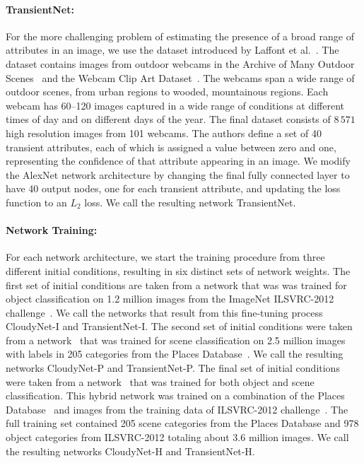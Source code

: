 \documentclass[10pt,twocolumn,letterpaper]{article}
\begin{document}
\paragraph{TransientNet:} For the more challenging problem of estimating the
presence of a broad range of attributes in an image, we use the dataset
introduced by Laffont et al.~\cite{Laffont14}.  The dataset contains images
from outdoor webcams in the Archive of Many Outdoor Scenes~\cite{jacobs07amos}
and the Webcam Clip Art Dataset~\cite{lalondesig09}.  The webcams span a wide
range of outdoor scenes, from urban regions to wooded, mountainous regions.
Each webcam has 60--120 images captured in a wide range of conditions at
different times of day and on different days of the year.  The final dataset
consists of $8\,571$ high resolution images from 101 webcams.  The authors
define a set of 40 transient attributes, each of which is assigned a value
between zero and one, representing the confidence of that attribute appearing
in an image. We modify the AlexNet network architecture by changing the final
fully connected layer to have 40 output nodes, one for each transient
attribute, and updating the loss function to an $L_2$ loss. We call the
resulting network TransientNet. 

\vspace{-1em}
\paragraph{Network Training:} For each network architecture, we start the training procedure from three different initial conditions,
resulting in six distinct sets of network weights. The first set of initial
conditions are taken from a network that was was trained for object
classification on 1.2 million images from the ImageNet ILSVRC-2012
challenge~\cite{ILSVRCarxiv14}.  We call the networks that result from this
fine-tuning process CloudyNet-I and TransientNet-I.  The second set of initial
conditions were taken from a network~\cite{zhou2014places} that was trained for
scene classification on 2.5 million images with labels in 205 categories from
the Places Database~\cite{zhou2014places}. We call the resulting networks
CloudyNet-P and TransientNet-P.  The final set of initial conditions were taken
from a network~\cite{zhou2014places} that was trained for both object and scene
classification.  This hybrid network was trained on a combination of the Places
Database~\cite{zhou2014places} and images from the training data of ILSVRC-2012
challenge~\cite{ILSVRCarxiv14}.  The full training set contained 205 scene
categories from the Places Database and 978 object categories from ILSVRC-2012
totaling about 3.6 million images.  We call the resulting networks CloudyNet-H
and TransientNet-H.
\end{document}
